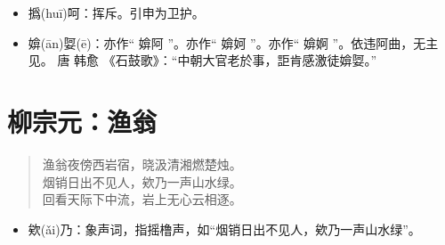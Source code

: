 \documentclass[12pt,oneside]{book}
\newenvironment{shici}{
\begin{verse}
\centering\large\hspace{12pt}}
{\end{verse}}
\begin{document}
\begin{itemize}
\item 撝(huī)呵：挥斥。引申为卫护。
\item 媕(ān)娿(ē)：亦作“ 媕阿 ”。亦作“ 媕妸 ”。亦作“ 媕婀 ”。依违阿曲，无主见。 唐 韩愈 《石鼓歌》：“中朝大官老於事，詎肯感激徒媕娿。”
\end{itemize}


\chapter{柳宗元：渔翁}
\begin{shici}
渔翁夜傍西岩宿，晓汲清湘燃楚烛。\\
烟销日出不见人，欸乃一声山水绿。\\
回看天际下中流，岩上无心云相逐。
\end{shici}

\begin{itemize}
\item 欸(ǎi)乃：象声词，指摇橹声，如“烟销日出不见人，欸乃一声山水绿”。
\end{itemize}
\end{document}
